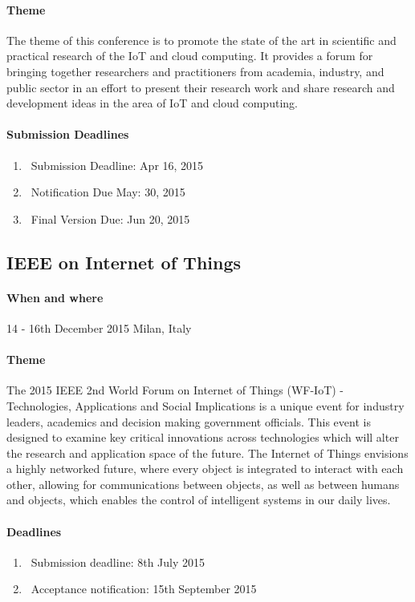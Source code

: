 \documentclass[12pt]{article}
\begin{document}
\paragraph {Theme} The theme of this conference is to promote the state of the art in scientific and practical research of the IoT and cloud computing. It provides a forum for bringing together researchers and practitioners from academia, industry, and public sector in an effort to present their research work and share research and development ideas in the area of IoT and cloud computing. 
\paragraph {Submission Deadlines} 
\begin{enumerate}
\item\ Submission Deadline:	Apr 16, 2015
\item\ Notification Due	May: 30, 2015
\item\ Final Version Due: Jun 20, 2015
\end{enumerate}
\subsection{IEEE on Internet of Things} 
\paragraph {When and where} 14 - 16th December 2015 Milan, Italy
\paragraph {Theme} The 2015 IEEE 2nd World Forum on Internet of Things (WF-IoT) - Technologies, Applications and Social Implications is a unique event for industry leaders, academics and decision making government officials. This event is designed to examine key critical innovations across technologies which will alter the research and application space of the future. The Internet of Things envisions a highly networked future, where every object is integrated to interact with each other, allowing for communications between objects, as well as between humans and objects, which enables the control of intelligent systems in our daily lives.
\paragraph {Deadlines}
\begin{enumerate}
\item\ Submission deadline: 8th July 2015
\item\ Acceptance notification: 15th September 2015

\end{enumerate}
\end{document}
